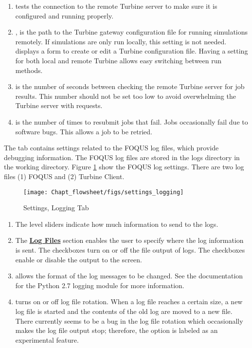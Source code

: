 \begin{enumerate}
	\item {} tests the connection to the remote Turbine server to make sure it is configured and running properly.

	\item {}, is the path to the Turbine gateway configuration file for running simulations remotely. If simulations are only run locally, this setting is not needed.  displays a form to create or edit a Turbine configuration file. Having a setting for both local and remote Turbine allows easy switching between run methods.
	
	\item {} is the number of seconds between checking the remote Turbine server for job results. This number should not be set too low to avoid overwhelming the Turbine server with requests.
	
	\item {} is the number of times to resubmit jobs that fail. Jobs occasionally fail due to software bugs. This allows a job to be retried.

\end{enumerate}

The  tab contains settings related to the FOQUS log files, which provide debugging information. The FOQUS log files are stored in the logs directory in the working directory. Figure \ref{fig.settings.logging} show the FOQUS log settings. There are two log files (1) FOQUS and (2) Turbine Client.

\begin{figure}[H]
	\begin{center}
		\texttt{[image: Chapt\_flowsheet/figs/settings\_logging]}
		\caption{Settings, Logging Tab}
		\label{fig.settings.logging}
	\end{center}
\end{figure}

\begin{enumerate}
	\item The level sliders indicate how much information to send to the logs.
	\item The \textbf{\underline{Log Files}} section enables the user to specify where the log information is sent. The  checkboxes turn on or off the file output of logs. The  checkboxes enable or disable the output to the screen.
	\item {} allows the format of the log messages to be changed. See the documentation for the Python 2.7 logging module for more information.
	\item {} turns on or off log file rotation. When a log file reaches a certain size, a new log file is started and the contents of the old log are moved to a new file. There currently seems to be a bug in the log file rotation which occasionally makes the log file output stop; therefore, the  option is labeled as an experimental feature.
\end{enumerate}